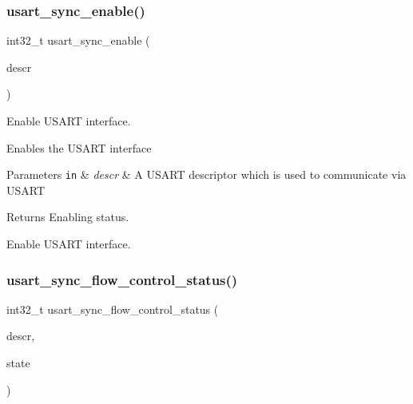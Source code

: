 \subsubsection{\texorpdfstring{usart\+\_\+sync\+\_\+enable()}{usart\_sync\_enable()}}
{\footnotesize\ttfamily int32\+\_\+t usart\+\_\+sync\+\_\+enable (\begin{DoxyParamCaption}\item[{struct \hyperlink{structusart__sync__descriptor}{usart\+\_\+sync\+\_\+descriptor} $\ast$const}]{descr }\end{DoxyParamCaption})}



Enable U\+S\+A\+RT interface. 

Enables the U\+S\+A\+RT interface


\begin{DoxyParams}[1]{Parameters}
\mbox{\tt in}  & {\em descr} & A U\+S\+A\+RT descriptor which is used to communicate via U\+S\+A\+RT\\
\hline
\end{DoxyParams}
\begin{DoxyReturn}{Returns}
Enabling status.
\end{DoxyReturn}
Enable U\+S\+A\+RT interface. \mbox{\label{group__doc__driver__hal__usart__sync_ga34932fa96b2190715b37f2c2c784a2f4}} 
\subsubsection{\texorpdfstring{usart\+\_\+sync\+\_\+flow\+\_\+control\+\_\+status()}{usart\_sync\_flow\_control\_status()}}
{\footnotesize\ttfamily int32\+\_\+t usart\+\_\+sync\+\_\+flow\+\_\+control\+\_\+status (\begin{DoxyParamCaption}\item[{const struct \hyperlink{structusart__sync__descriptor}{usart\+\_\+sync\+\_\+descriptor} $\ast$const}]{descr,  }\item[{union \hyperlink{unionusart__flow__control__state}{usart\+\_\+flow\+\_\+control\+\_\+state} $\ast$const}]{state }\end{DoxyParamCaption})}



